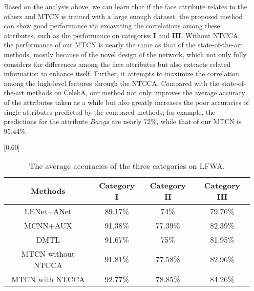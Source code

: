 \documentclass{sig-alternate-05-2015}
\begin{document}
 Based on the analysis above, we can learn that if the face attribute relates to the others and MTCN is trained with a large enough dataset, the proposed method can show good performance via excavating the correlations among these attributes, such as the performance on categories \textbf{I} and \textbf{III}. Without NTCCA, the performance of our MTCN is nearly the same as that of the state-of-the-art methods, mostly because of the novel design of the network, which not only fully considers the differences among the face attributes but also extracts related information  to enhance itself. Further, it attempts to maximize the correlation among the high-level features through the NTCCA. Compared with the state-of-the-art methods on CelebA, our method not only improves the average accuracy of the attributes taken as a while but also greatly increases the poor accuracies of single attributes predicted by the compared methods; for example, the predictions for the attribute $Bangs$ are nearly 72\%, while that of our MTCN is 95.44\%.

\begin{table}[!hbpt]
\centering
\caption{The average accuracies of the three categories on LFWA.}
\scalebox{0.65}[0.60]{%
\begin{tabular}{c|c|c|c}
\toprule[2pt]
\textbf{Methods} & \textbf{Category I}&\textbf{Category II}&\textbf{Category III}\\\midrule[1pt]
LENet+ANet\cite{7410782}&89.17\%&74\%&79.76\%\\
\hline
MCNN+AUX\cite{hand2017attributes}&91.38\%&77.39\%&82.39\%\\
\hline
DMTL\cite{Han2017Heterogeneous}&91.67\%&75\%&81.95\%\\
\hline
MTCN without NTCCA&91.81\%&77.58\%&82.96\%\\
\hline
MTCN with NTCCA&92.77\%&78.85\%&84.26\%\\
\bottomrule[2pt]
\end{tabular}}
\label{tab:026}
\end{table}
\end{document}
